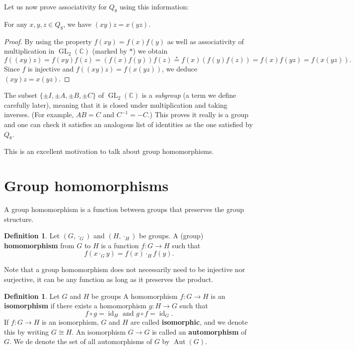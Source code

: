 \documentclass[12pt]{report}
\numberwithin{equation}{section}
\numberwithin{theorem}{chapter}
\theoremstyle{definition}
\newtheorem{definition}[theorem]{Definition}
\newtheorem*{basic properties}{Basic Properties}
\newtheorem*{Important Remark}{Important Remark}
\newcommand{\df}[1]{{\bf #1}\index{#1}}
\DeclareMathOperator{\GL}{GL}
\newcommand{\C}{\mathbb{C}}
\DeclareMathOperator{\id}{id}
\DeclareMathOperator{\Aut}{Aut}
\begin{document}
Let us now prove associativity for $Q_8$ using this information:
\smallskip

 For any $x,y,z\in Q_8$, we have $(xy)z=x(yz)$.
\begin{proof}
By using the property $f(xy)=f(x)f(y)$ as well as associativity of multiplication in $\GL_2(\C)$ (marked by $*$) we obtain
$$f((xy)z)=f(xy)f(z)=\left(f(x)f(y)\right)f(z)\stackrel{*}{=}f(x)\left(f(y)f(z)\right)=f(x)f(yz)=f(x(yz)).$$
Since $f$ is injective and $f((xy)z)=f(x(yz))$, we deduce  $(xy)z=x(yz)$.
\end{proof}


The subset $\{\pm I, \pm A, \pm B, \pm C\}$ of $\GL_2(\C)$ is a {\em subgroup} (a term we
define carefully later), meaning that it is closed under multiplication and taking inverses. (For example, $AB= C$ and $C^{-1} = -C$.) This proves it really is a group
and one can check it satisfies an analogous  list of identities as the one satisfied by $Q_8$.  



\vspace{1em}


This is an excellent motivation to talk about group homomorphisms.




\section{Group homomorphisms}



A group homomorphism is a function between groups that preserves the group structure.

\begin{definition}
Let $(G, \cdot_G)$ and $(H, \cdot_H)$ be groups.
A (group) {\bf homomorphism} from $G$ to $H$ is a function $f: G \to H$ such that 
$$f(x \cdot_G y) = f(x) \cdot_H f(y).$$
\end{definition}

Note that a group homomorphism does not necessarily need to be injective nor surjective, it can be any function as long as it preserves the product.

\begin{definition}\label{def:gpiso}\index{$\Aut(G)$}
Let $G$ and $H$ be groups A homomorphism $f\!: G \to H$ is an \df{isomorphism} if there exists a homomorphism $g: H \to G$ such that 
$$f \circ g = \id_H \textrm{ and } g \circ f = \id_G.$$
If $f:G\to H$ is an isomorphism, $G$ and $H$ are called {\bf isomorphic}, and we denote this by writing $G\cong H$. An isomorphism $G \longrightarrow G$ is called an \df{automorphism} of $G$. We de denote the set of all automorphisms of $G$ by $\Aut(G)$.
\end{definition}
 
\end{document}
